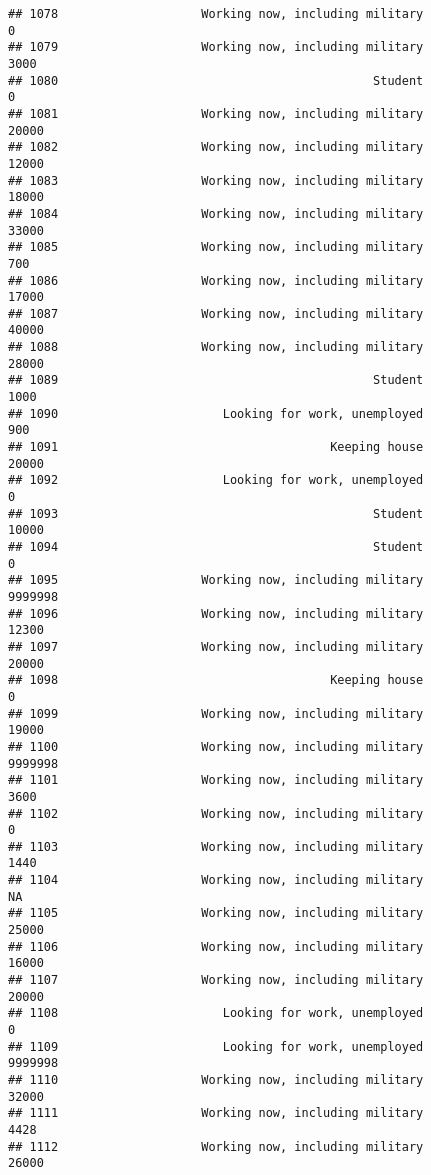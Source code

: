 \documentclass[]{book}
\theoremstyle{definition}
\theoremstyle{definition}
\theoremstyle{remark}
\begin{document}
\begin{verbatim}
## 1078                    Working now, including military               0
## 1079                    Working now, including military            3000
## 1080                                            Student               0
## 1081                    Working now, including military           20000
## 1082                    Working now, including military           12000
## 1083                    Working now, including military           18000
## 1084                    Working now, including military           33000
## 1085                    Working now, including military             700
## 1086                    Working now, including military           17000
## 1087                    Working now, including military           40000
## 1088                    Working now, including military           28000
## 1089                                            Student            1000
## 1090                       Looking for work, unemployed             900
## 1091                                      Keeping house           20000
## 1092                       Looking for work, unemployed               0
## 1093                                            Student           10000
## 1094                                            Student               0
## 1095                    Working now, including military         9999998
## 1096                    Working now, including military           12300
## 1097                    Working now, including military           20000
## 1098                                      Keeping house               0
## 1099                    Working now, including military           19000
## 1100                    Working now, including military         9999998
## 1101                    Working now, including military            3600
## 1102                    Working now, including military               0
## 1103                    Working now, including military            1440
## 1104                    Working now, including military              NA
## 1105                    Working now, including military           25000
## 1106                    Working now, including military           16000
## 1107                    Working now, including military           20000
## 1108                       Looking for work, unemployed               0
## 1109                       Looking for work, unemployed         9999998
## 1110                    Working now, including military           32000
## 1111                    Working now, including military            4428
## 1112                    Working now, including military           26000

\end{verbatim}
\end{document}
